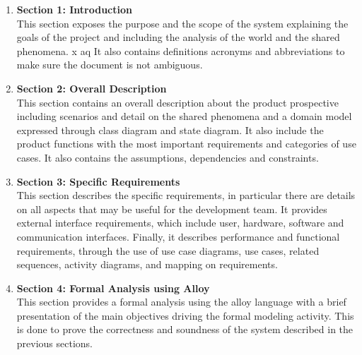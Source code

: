 \begin{enumerate}
    \item \textbf{Section 1: Introduction} \\
          This section exposes the purpose and the scope of the system explaining the goals of the project and including the analysis of the world and the shared phenomena. x  aq
          It also contains definitions acronyms and abbreviations to make sure the document is not ambiguous.
    \item \textbf{Section 2: Overall Description} \\
          This section contains an overall description about the product prospective including scenarios and detail on the shared phenomena and a domain model expressed through class diagram and state diagram. It also include the product functions with the most important requirements and categories of use cases. It also contains the assumptions, dependencies and constraints.
          
    \item \textbf{Section 3: Specific Requirements} \\
          This section describes the specific requirements, in particular there are details on all aspects that may be useful for the development team.
          It provides external interface requirements, which include user, hardware, software and communication interfaces.
          Finally, it describes performance and functional requirements, through the use of use case diagrams, use cases, related sequences, activity diagrams, and mapping on requirements.
    \item \textbf{Section 4: Formal Analysis using Alloy} \\
        This section provides a formal analysis using the alloy language with a brief presentation of the main objectives driving the formal modeling activity. This is done to prove the correctness and soundness of the system described in the previous sections.
\end{enumerate}

